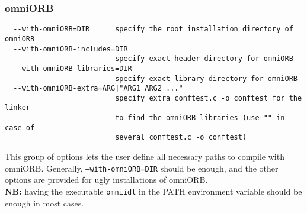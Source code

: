 




\subsubsection{omniORB}
{\footnotesize
\begin{verbatim}
  --with-omniORB=DIR      specify the root installation directory of omniORB
  --with-omniORB-includes=DIR
                          specify exact header directory for omniORB
  --with-omniORB-libraries=DIR
                          specify exact library directory for omniORB
  --with-omniORB-extra=ARG|"ARG1 ARG2 ..."
                          specify extra conftest.c -o conftest for the linker
                          to find the omniORB libraries (use "" in case of 
                          several conftest.c -o conftest)
\end{verbatim}
}
\noindent This group of options lets the user define all necessary
paths to compile with omniORB. Generally, \texttt{--with-omniORB=DIR}
should be enough, and the other options are provided for ugly
installations of omniORB.\\ \textbf{NB:} having the executable
\texttt{omniidl} in the PATH environment variable should be enough in
most cases.

